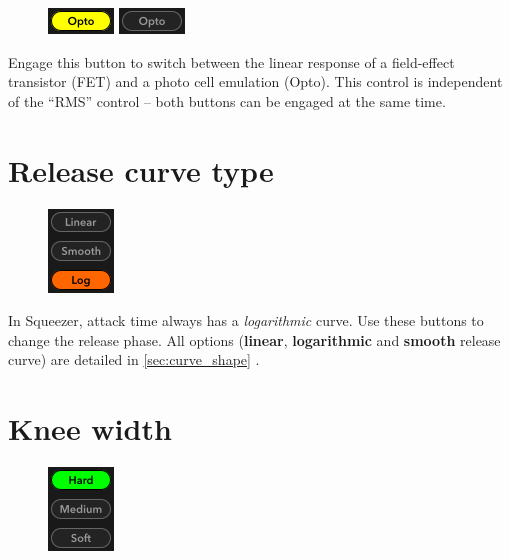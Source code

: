 \begin{figure}
  \includegraphics[scale=\screenshotscale,clip]{include/images/button_opto_on.png}
  \newline \vspace{-0.9\baselineskip}
  \includegraphics[scale=\screenshotscale,clip]{include/images/button_opto_off.png}
\end{figure}

Engage this button to switch between the linear response of a
field-effect transistor (FET) and a photo cell emulation (Opto).  This
control is independent of the ``RMS'' control -- both buttons can be
engaged at the same time.

\section{Release curve type}

\begin{figure}
  \includegraphics[scale=\screenshotscale,clip]{include/images/buttons_release_curve.png}
\end{figure}

In Squeezer, attack time always has a \emph{logarithmic} curve.  Use
these buttons to change the release phase.  All options
(\textbf{linear}, \textbf{logarithmic} and \textbf{smooth} release
curve) are detailed in \ref{sec:curve_shape} .

\section{Knee width}

\begin{figure}
  \includegraphics[scale=\screenshotscale,clip]{include/images/buttons_knee_width.png}
\end{figure}

